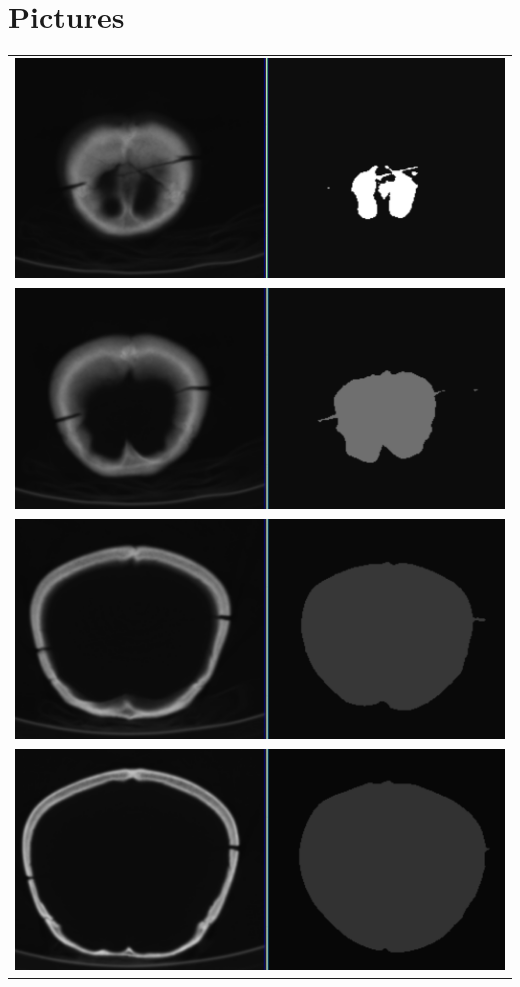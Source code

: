 \chapter{Pictures}

\begin{table}[ht]
    \centering
    \begin{tabular}{c}
    \includegraphics[scale=.5]{data/png/2}\\
    \newline
    \includegraphics[scale=.5]{data/png/4}\\
    \newline
    \includegraphics[scale=.5]{data/png/7}\\
    \newline
    \includegraphics[scale=.5]{data/png/12}\\
    \end{tabular}
    \label{tab:gt1}
\end{table}%

